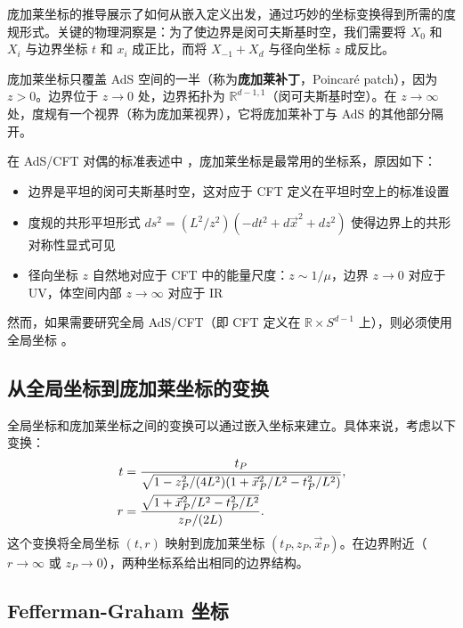 \begin{remark}
庞加莱坐标的推导展示了如何从嵌入定义出发，通过巧妙的坐标变换得到所需的度规形式。关键的物理洞察是：为了使边界是闵可夫斯基时空，我们需要将 $X_0$ 和 $X_i$ 与边界坐标 $t$ 和 $x_i$ 成正比，而将 $X_{-1} + X_d$ 与径向坐标 $z$ 成反比。
\end{remark}

\begin{remark}
庞加莱坐标只覆盖 AdS 空间的一半（称为\textbf{庞加莱补丁}，Poincaré patch），因为 $z > 0$。边界位于 $z \to 0$ 处，边界拓扑为 $\mathbb{R}^{d-1,1}$（闵可夫斯基时空）。在 $z \to \infty$ 处，度规有一个视界（称为庞加莱视界），它将庞加莱补丁与 AdS 的其他部分隔开。
\end{remark}

\begin{remark}
在 AdS/CFT 对偶的标准表述中 \cite{Witten1998}，庞加莱坐标是最常用的坐标系，原因如下：
\begin{itemize}
    \item 边界是平坦的闵可夫斯基时空，这对应于 CFT 定义在平坦时空上的标准设置
    \item 度规的共形平坦形式 $ds^2 = (L^2/z^2)(-dt^2 + d\vec{x}^2 + dz^2)$ 使得边界上的共形对称性显式可见
    \item 径向坐标 $z$ 自然地对应于 CFT 中的能量尺度：$z \sim 1/\mu$，边界 $z \to 0$ 对应于 UV，体空间内部 $z \to \infty$ 对应于 IR
\end{itemize}
然而，如果需要研究全局 AdS/CFT（即 CFT 定义在 $\mathbb{R} \times S^{d-1}$ 上），则必须使用全局坐标 \cite{Witten1998}。
\end{remark}

\subsection{从全局坐标到庞加莱坐标的变换}

全局坐标和庞加莱坐标之间的变换可以通过嵌入坐标来建立。具体来说，考虑以下变换：
\begin{align}
    t &= \frac{t_P}{\sqrt{1 - z_P^2/(4L^2)(1 + \vec{x}_P^2/L^2 - t_P^2/L^2)}}, \notag \\
    r &= \frac{\sqrt{1 + \vec{x}_P^2/L^2 - t_P^2/L^2}}{z_P/(2L)}.
\end{align}
这个变换将全局坐标 $(t, r)$ 映射到庞加莱坐标 $(t_P, z_P, \vec{x}_P)$。在边界附近（$r \to \infty$ 或 $z_P \to 0$），两种坐标系给出相同的边界结构。

\subsection{Fefferman-Graham 坐标}


